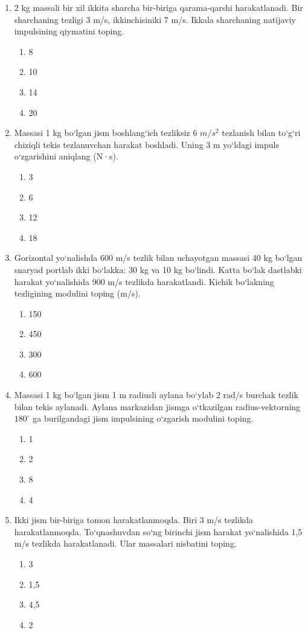 \begin{enumerate}
	\item 2 kg massali bir xil ikkita sharcha bir-biriga qarama-qarshi harakatlanadi. Bir sharchaning tezligi 3 m/s, ikkinchisiniki 7 m/s. Ikkala sharchaning natijaviy impulsining qiymatini toping.
	\begin{enumerate}[label=\Alph*)]
		\item 8
		\item 10
		\item 14
		\item 20
	\end{enumerate}
	
	\item Massasi 1 kg bo‘lgan jism boshlang‘ich tezliksiz 6 $m/s^2$ tezlanish bilan to‘g‘ri chiziqli tekis tezlanuvchan harakat boshladi. Uning 3 m yo‘ldagi impuls o‘zgarishini aniqlang (N·s).
	\begin{enumerate}[label=\Alph*)]
		\item 3
		\item 6
		\item 12
		\item 18
	\end{enumerate}
	
	\item Gorizontal yo‘nalishda 600 m/s tezlik bilan uchayotgan massasi 40 kg bo‘lgan snaryad portlab ikki bo‘lakka: 30 kg va 10 kg bo‘lindi. Katta bo‘lak dastlabki harakat yo‘nalishida 900 m/s tezlikda harakatlandi. Kichik bo‘lakning tezligining modulini toping (m/s).
	\begin{enumerate}[label=\Alph*)]
		\item 150
		\item 450
		\item 300
		\item 600
	\end{enumerate}
	
	\item Massasi 1 kg bo‘lgan jism 1 m radiusli aylana bo‘ylab 2 rad/s burchak tezlik bilan tekis aylanadi. Aylana markazidan jismga o‘tkazilgan radius-vektorning $180^\circ$ ga burilgandagi jism impulsining o‘zgarish modulini toping.
	\begin{enumerate}[label=\Alph*)]
		\item 1
		\item 2
		\item 8
		\item 4
	\end{enumerate}
	
	\item Ikki jism bir-biriga tomon harakatlanmoqda. Biri 3 m/s tezlikda harakatlanmoqda. To‘qnashuvdan so‘ng birinchi jism harakat yo‘nalishida 1,5 m/s tezlikda harakatlanadi. Ular massalari nisbatini toping.
	\begin{enumerate}[label=\Alph*)]
		\item 3
		\item 1,5
		\item 4,5
		\item 2
	\end{enumerate}
	

\end{enumerate}
